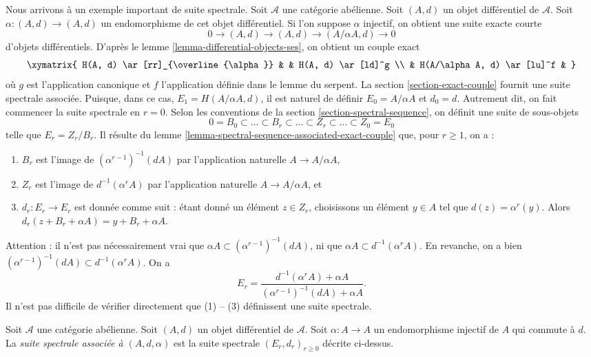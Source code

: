 \noindent
Nous arrivons à un exemple important de suite spectrale.
Soit $\mathcal{A}$ une catégorie abélienne.
Soit $(A, d)$ un objet différentiel de $\mathcal{A}$.
Soit $\alpha : (A, d) \to (A, d)$ un endomorphisme de cet objet
différentiel. Si l'on suppose $\alpha$ injectif, on obtient une suite exacte courte
$$
0 \to (A, d) \to (A, d) \to (A/\alpha A, d) \to 0
$$
d'objets différentiels. D'après le
lemme \ref{lemma-differential-objects-ses}, on obtient un couple exact
$$
\xymatrix{
H(A, d) \ar[rr]_{\overline{\alpha}} & & H(A, d) \ar[ld]^g \\
& H(A/\alpha A, d) \ar[lu]^f &
}
$$
où $g$ est l'application canonique et $f$ l'application définie dans le lemme du serpent.
La section \ref{section-exact-couple} fournit une suite spectrale associée.
Puisque, dans ce cas, $E_1 = H(A/\alpha A, d)$,
il est naturel de définir $E_0 = A/\alpha A$ et $d_0 = d$.
Autrement dit, on fait commencer la suite spectrale
en $r = 0$. Selon les conventions de la
section \ref{section-spectral-sequence}, on définit une suite de sous-objets
$$
0 = B_0 \subset \ldots \subset B_r \subset \ldots
\subset Z_r \subset \ldots \subset Z_0 = E_0
$$
telle que $E_r = Z_r/B_r$. Il résulte du
lemme \ref{lemma-spectral-sequence-associated-exact-couple}
que, pour $r \geq 1$, on a :
\begin{enumerate}
\item $B_r$ est l'image de $(\alpha^{r - 1})^{-1}(d A)$
par l'application naturelle $A \to A/\alpha A$,
\item $Z_r$ est l'image de $d^{-1}(\alpha^r A)$
par l'application naturelle $A \to A/\alpha A$, et
\item $d_r : E_r \to E_r$ est donnée comme suit : étant donné un élément
$z \in Z_r$, choisissons un élément $y \in A$ tel que $d(z) = \alpha^r(y)$. Alors
$d_r(z + B_r + \alpha A) = y + B_r + \alpha A$.
\end{enumerate}
Attention : il n'est pas nécessairement vrai que
$\alpha A \subset (\alpha^{r - 1})^{-1}(dA)$, ni que
$\alpha A \subset d^{-1}(\alpha^r A)$. En revanche, on a bien
$(\alpha^{r - 1})^{-1}(dA) \subset d^{-1}(\alpha^r A)$.
On a
$$
E_r
=
\frac{d^{-1}(\alpha^r A) + \alpha A}{(\alpha^{r - 1})^{-1}(dA) + \alpha A}.
$$
Il n'est pas difficile de vérifier directement que (1) -- (3) définissent une suite spectrale.

\begin{definition}
\label{definition-differential-object-selfmap}
Soit $\mathcal{A}$ une catégorie abélienne.
Soit $(A, d)$ un objet différentiel de $\mathcal{A}$.
Soit $\alpha : A \to A$ un endomorphisme injectif de $A$ qui
commute à $d$. La {\it suite spectrale associée à
$(A, d, \alpha)$} est la suite spectrale
$(E_r, d_r)_{r \geq 0}$ décrite ci-dessus.
\end{definition}


